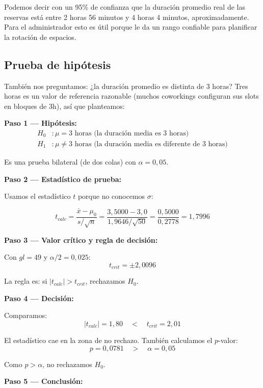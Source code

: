 \documentclass[12pt,a4paper]{article}
\begin{document}
Podemos decir con un 95\% de confianza que la duración promedio real de las reservas está entre 2 horas 56 minutos y 4 horas 4 minutos, aproximadamente. Para el administrador esto es útil porque le da un rango confiable para planificar la rotación de espacios.

\subsection{Prueba de hipótesis}

También nos preguntamos: ¿la duración promedio es distinta de 3 horas? Tres horas es un valor de referencia razonable (muchos coworkings configuran sus slots en bloques de 3h), así que planteamos:

\vspace{6pt}
\textbf{Paso 1 — Hipótesis:}
\begin{align*}
H_0&: \mu = 3 \text{ horas (la duración media es 3 horas)} \\
H_1&: \mu \neq 3 \text{ horas (la duración media es diferente de 3 horas)}
\end{align*}

Es una prueba bilateral (de dos colas) con $\alpha = 0{,}05$.

\vspace{6pt}
\textbf{Paso 2 — Estadístico de prueba:}

Usamos el estadístico $t$ porque no conocemos $\sigma$:

\vspace{4pt}
$$t_{calc} = \frac{\bar{x} - \mu_0}{s / \sqrt{n}} = \frac{3{,}5000 - 3{,}0}{1{,}9646 / \sqrt{50}} = \frac{0{,}5000}{0{,}2778} = 1{,}7996$$

\vspace{6pt}
\textbf{Paso 3 — Valor crítico y regla de decisión:}

Con $gl = 49$ y $\alpha/2 = 0{,}025$:
$$t_{crit} = \pm 2{,}0096$$

La regla es: si $|t_{calc}| > t_{crit}$, rechazamos $H_0$.

\vspace{6pt}
\textbf{Paso 4 — Decisión:}

Comparamos:
$$|t_{calc}| = 1{,}80 \quad < \quad t_{crit} = 2{,}01$$

El estadístico cae en la zona de no rechazo. También calculamos el $p$-valor:
$$p = 0{,}0781 \quad > \quad \alpha = 0{,}05$$

Como $p > \alpha$, no rechazamos $H_0$.

\vspace{6pt}
\textbf{Paso 5 — Conclusión:}
\end{document}
